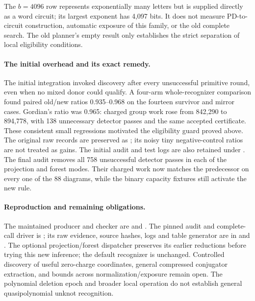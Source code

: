 The $b=4096$ row represents exponentially many letters but is supplied directly
as a word circuit; its largest exponent has 4,097 bits. It does not measure PD-to-circuit construction, automatic
exposure of this family, or the old complete search. The old planner's empty
result only establishes the strict separation of local eligibility conditions.

\paragraph{The initial overhead and its exact remedy.}
The initial integration invoked discovery after every unsuccessful primitive
round, even when no mixed donor could qualify. A four-arm whole-recognizer
comparison found paired old/new ratios 0.935--0.968 on the fourteen survivor
and mirror cases. Gordian's ratio was 0.965: charged group work rose from
842,290 to 894,778, with 138 unnecessary detector passes and the same accepted
certificate. These consistent small regressions motivated the eligibility
guard proved above. The original raw records are preserved as
; its noisy tiny negative-control
ratios are not treated as gains. The initial audit and test logs are also
retained under .
The final audit removes all 758 unsuccessful detector passes in each of the
projection and forest modes. Their charged work now matches the predecessor
on every one of the 88 diagrams, while the binary capacity fixtures still
activate the new rule.



\paragraph{Reproduction and remaining obligations.}
The maintained producer and checker are 
and . The pinned audit and
complete-call driver is ;
its raw evidence, source hashes, logs and table generator are in
 and .
The optional projection/forest dispatcher preserves its earlier reductions
before trying this new inference; the default recognizer is unchanged.
Controlled discovery of useful zero-charge coordinates, general compressed
conjugator extraction, and bounds across normalization/exposure remain open.
The polynomial deletion epoch and broader local operation do not establish
general quasipolynomial unknot recognition.
